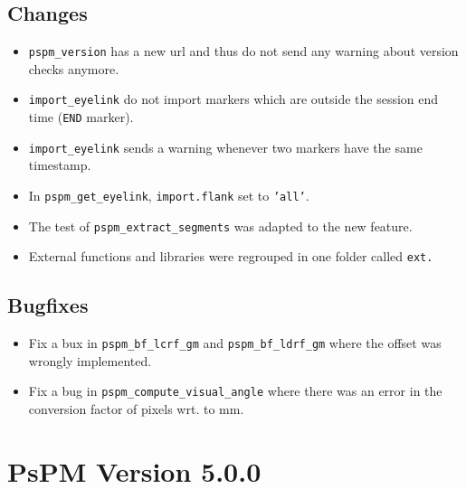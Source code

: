 \documentclass[english]{article}
\numberwithin{equation}{section}
\numberwithin{figure}{section}
\begin{document}
\subsection*{Changes}
\begin{itemize}
\item \texttt{pspm\_version} has a new url and thus do not send any warning
about version checks anymore.
\item \texttt{import\_eyelink} do not import markers which are outside the
session end time (\texttt{END} marker).
\item \texttt{import\_eyelink} sends a warning whenever two markers have
the same timestamp.
\item In \texttt{pspm\_get\_eyelink}, \texttt{import.flank} set to \texttt{'all'}.
\item The test of \texttt{pspm\_extract\_segments} was adapted to the new
feature.
\item External functions and libraries were regrouped in one folder called
\texttt{ext.}
\end{itemize}

\subsection*{Bugfixes}
\begin{itemize}
\item Fix a bux in \texttt{pspm\_bf\_lcrf\_gm} and \texttt{pspm\_bf\_ldrf\_gm}
where the offset was wrongly implemented.
\item Fix a bug in \texttt{pspm\_compute\_visual\_angle} where there was
an error in the conversion factor of pixels wrt. to mm.
\end{itemize}

\section{PsPM Version 5.0.0}
\end{document}
